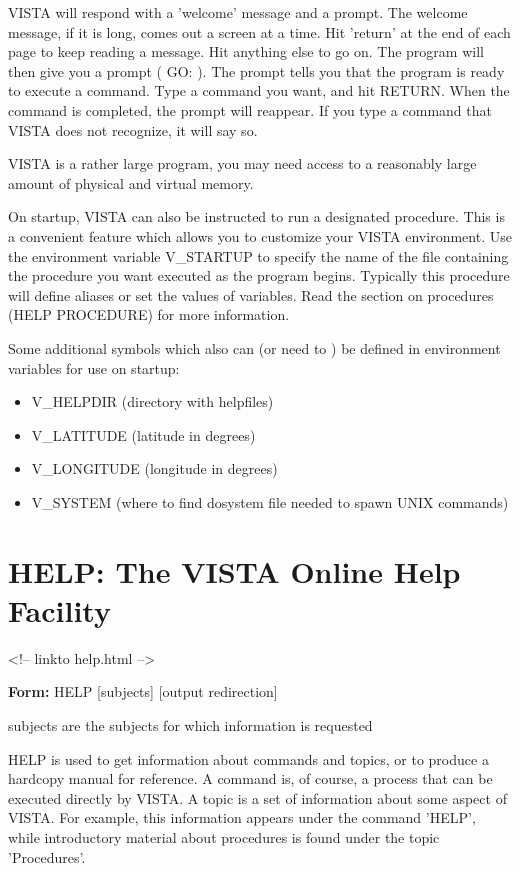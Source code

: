 VISTA will respond with a 'welcome' message and a prompt. The welcome
message, if it is long, comes out a screen at a time.  Hit 'return' at the
end of each page to keep reading a message.  Hit anything else to go on.
The program will then give you a prompt ( GO: ). The prompt tells you that
the program is ready to execute a command. Type a command you want, and hit
RETURN.  When the command is completed, the prompt will reappear.  If you
type a command that VISTA does not recognize, it will say so.

VISTA is a rather large program, you may need access to a reasonably large
amount of physical and virtual memory.

On startup, VISTA can also be instructed to run a designated procedure.
This is a convenient feature which allows you to customize your VISTA
environment.  Use the environment variable V\_STARTUP to specify the name
of the file containing the procedure you want executed as the program
begins.  Typically this procedure will define aliases or set the values of
variables.  Read the section on procedures (HELP PROCEDURE) for more
information.

Some additional symbols which also can (or need to ) be defined in
environment variables for use on startup:
\begin{itemize}
   \item{V\_HELPDIR     (directory with helpfiles)}
   \item{V\_LATITUDE (latitude in degrees)}
   \item{V\_LONGITUDE (longitude in degrees)}
   \item{V\_SYSTEM (where to find dosystem file needed to spawn UNIX commands)}
\end{itemize}

\section{HELP: The VISTA Online Help Facility}
\begin{rawhtml}
<!-- linkto help.html -->
\end{rawhtml}

\begin{command}
   \item[\textbf{Form: } HELP {[subjects]} {[output redirection]}\hfill]{}
   \item[subjects]{are the subjects for which information is requested}
\end{command}

HELP is used to get information about commands and topics, or to produce a
hardcopy manual for reference.  A command is, of course, a process that can
be executed directly by VISTA.  A topic is a set of information about some
aspect of VISTA.  For example, this information appears under the command
'HELP', while introductory material about procedures is found under the
topic 'Procedures'.

